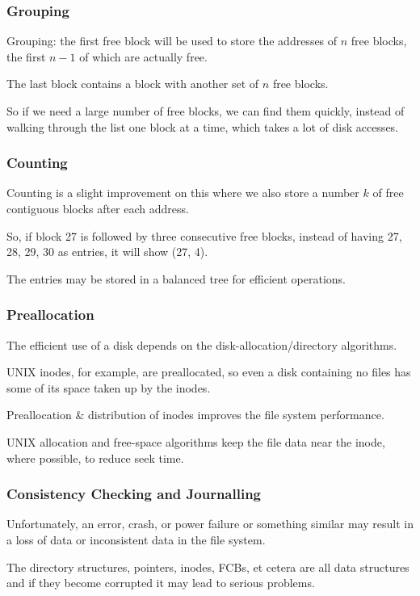 \begin{frame}
\frametitle{Grouping}

Grouping: the first free block will be used to store the addresses of $n$ free blocks, the first $n-1$ of which are actually free. 

The last block contains a block with another set of $n$ free blocks. 

So if we need a large number of free blocks, we can find them quickly, instead of walking through the list one block at a time, which takes a lot of disk accesses. 

\end{frame}

\begin{frame}
\frametitle{Counting}

Counting is a slight improvement on this where we also store a number $k$ of free contiguous blocks after each address. 

So, if block 27 is followed by three consecutive free blocks, instead of having 27, 28, 29, 30 as entries, it will show (27, 4). 

The entries may be stored in a balanced tree for efficient operations.~



\end{frame}

\begin{frame}
\frametitle{Preallocation}

The efficient use of a disk depends on the disk-allocation/directory algorithms. 

UNIX inodes, for example, are preallocated, so even a disk containing no files has some of its space taken up by the inodes. 

Preallocation \& distribution of inodes improves the file system performance.

UNIX allocation and free-space algorithms keep the file data near the inode, where possible, to reduce seek time.


\end{frame}

\begin{frame}
\frametitle{Consistency Checking and Journalling}

Unfortunately, an error, crash, or power failure or something similar may result in a loss of data or inconsistent data in the file system. 

The directory structures, pointers, inodes, FCBs, et cetera are all data structures and if they become corrupted it may lead to serious problems.


\end{frame}

